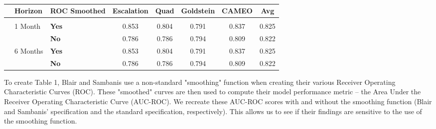 \begin{table}

\begin{threeparttable}
\caption{\label{tab:tab-1}}
\centering
\begin{tabular}[t]{ll>{\bfseries}lccccc}
\toprule
 & Horizon & ROC Smoothed & Escalation & Quad & Goldstein & CAMEO & Avg\\
\midrule
\addlinespace[0.3em]
\multicolumn{8}{l}{\textbf{Base Specification}}\\
\hspace{1em} & 1 Month & Yes & 0.853 & 0.804 & 0.791 & 0.837 & 0.825\\
\cmidrule{3-8}
\hspace{1em}\hspace{1em} &  & No & 0.786 & 0.786 & 0.794 & 0.809 & 0.822\\
\cmidrule{2-8}
\hspace{1em} & 6 Months & Yes & 0.853 & 0.804 & 0.791 & 0.837 & 0.825\\
\cmidrule{3-8}
 &  & No & 0.786 & 0.786 & 0.794 & 0.809 & 0.822\\
\bottomrule
\end{tabular}
\begin{tablenotes}
\small
\item [] To create Table 1, Blair and Sambanis use a non-standard "smoothing" function when creating their various Receiver Operating Characteristic Curves (ROC). These "smoothed" curves are then used to compute their model performance metric -- the Area Under the Receiver Operating Characteristic Curve (AUC-ROC). We recreate these AUC-ROC scores with and without the smoothing function (Blair and Sambanis' specification and the standard specification, respectively). This allows us to see if their findings are sensitive to the use of the smoothing function.
\end{tablenotes}
\end{threeparttable}
\end{table}
